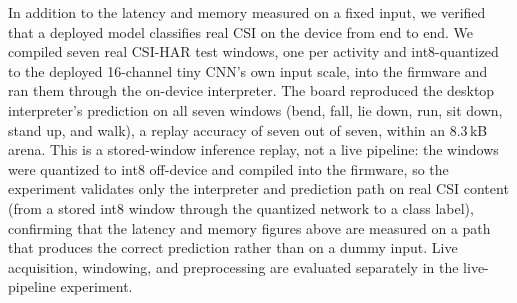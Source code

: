 \documentclass{ieeeaccess}
\begin{document}
In addition to the latency and memory measured on a fixed input, we verified that a deployed model classifies real CSI on the device from end to end. We compiled seven real CSI-HAR test windows, one per activity and int8-quantized to the deployed 16-channel tiny CNN's own input scale, into the firmware and ran them through the on-device interpreter. The board reproduced the desktop interpreter's prediction on all seven windows (bend, fall, lie down, run, sit down, stand up, and walk), a replay accuracy of seven out of seven, within an 8.3\,kB arena. This is a stored-window inference replay, not a live pipeline: the windows were quantized to int8 off-device and compiled into the firmware, so the experiment validates only the interpreter and prediction path on real CSI content (from a stored int8 window through the quantized network to a class label), confirming that the latency and memory figures above are measured on a path that produces the correct prediction rather than on a dummy input. Live acquisition, windowing, and preprocessing are evaluated separately in the live-pipeline experiment.
\end{document}
